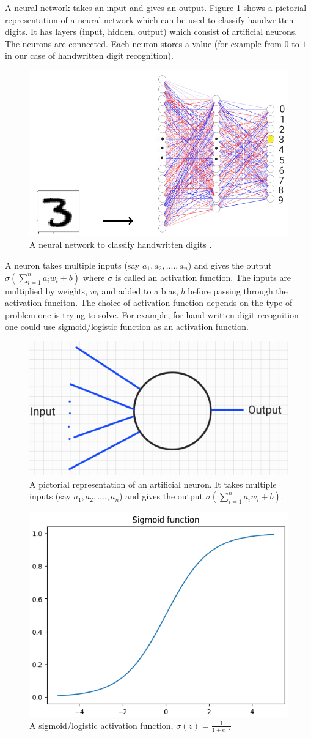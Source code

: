 A neural network takes an input and gives an output. Figure \ref{fig:ff_net} shows a pictorial representation of
a neural network which can be used to classify handwritten digits. It has layers (input, hidden, output) which consist of 
artificial neurons. The neurons are connected. Each neuron stores a value (for example from $0$ to $1$ in 
our case of handwritten digit recognition). 
\begin{figure}[htbp]
    \centering
    \includegraphics[width=.8\textwidth]{Figures/ff_net.png}
    \caption{A neural network to classify handwritten digits \cite{nn_SVG}.}
    \label{fig:ff_net}
\end{figure} 
A neuron takes multiple inputs (say $a_1, a_2,....,a_n$) and gives the output $\sigma(\sum_{i =1}^n a_i w_i + b)$ where $\sigma$ is
called an activation function. The inputs are multiplied by weights, $w_i$ and added to a bias, $b$ before passing through the activation funciton.
The choice of activation function depends on the type of problem one is trying to solve. For example, for hand-written digit recognition one could use sigmoid/logistic function
as an activation function. 
\begin{figure}[htbp]
    \centering
    \includegraphics[width=.4\textwidth]{Figures/neuron.png}
    \caption{A pictorial representation of an artificial neuron. It takes 
    multiple inputs (say $a_1, a_2,....,a_n$) and gives the output $\sigma(\sum_{i =1}^n a_i w_i + b)$.}
    \label{fig:neuron}
\end{figure} 
\begin{figure}[htbp]
    \centering
    \includegraphics[width=.4\textwidth]{Figures/sigmoid.png}
    \caption{A sigmoid/logistic activation function, $\sigma (z) = \frac{1}{1+ e^{-z}}$}
    \label{fig:sig}
\end{figure} 

